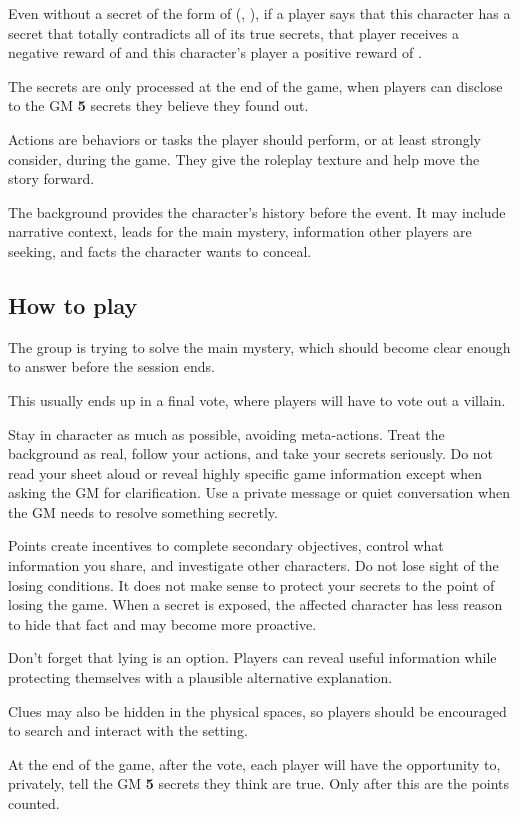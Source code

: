 Even without a secret of the form of (, ), if a player says that this character has a secret that totally contradicts all of its true secrets, that player receives a negative reward of  and this character's player a positive reward of .

The secrets are only processed at the end of the game, when players can disclose to the GM \textbf{5} secrets they believe they found out.

Actions are behaviors or tasks the player should perform, or at least strongly consider, during the game. They give the roleplay texture and help move the story forward.

The background provides the character's history before the event. It may include narrative context, leads for the main mystery, information other players are seeking, and facts the character wants to conceal.

\subsection{How to play}
The group is trying to solve the main mystery, which should become clear enough to answer before the session ends.

This usually ends up in a final vote, where players will have to vote out a villain.

Stay in character as much as possible, avoiding meta-actions. Treat the background as real, follow your actions, and take your secrets seriously. Do not read your sheet aloud or reveal highly specific game information except when asking the GM for clarification. Use a private message or quiet conversation when the GM needs to resolve something secretly.

Points create incentives to complete secondary objectives, control what information you share, and investigate other characters. Do not lose sight of the losing conditions. It does not make sense to protect your secrets to the point of losing the game. When a secret is exposed, the affected character has less reason to hide that fact and may become more proactive. 

Don't forget that lying is an option. Players can reveal useful information while protecting themselves with a plausible alternative explanation. 

Clues may also be hidden in the physical spaces, so players should be encouraged to search and interact with the setting.

At the end of the game, after the vote, each player will have the opportunity to, privately, tell the GM \textbf{5} secrets they think are true. Only after this are the points counted.


